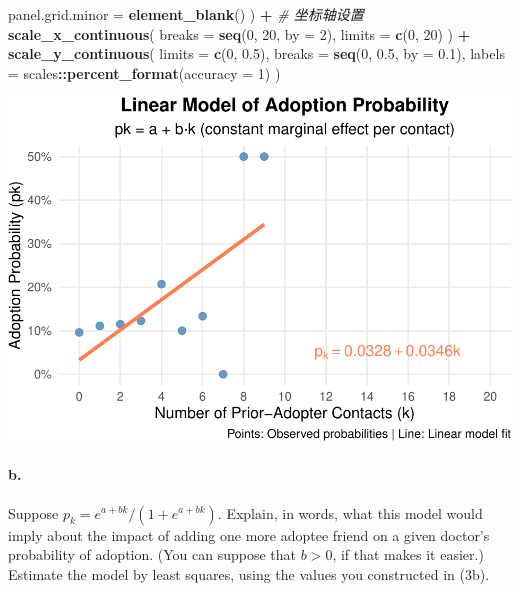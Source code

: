\documentclass[
]{article}
\newenvironment{Shaded}{\begin{snugshade}}{\end{snugshade}}
\newcommand{\AttributeTok}[1]{\textcolor[rgb]{0.13,0.29,0.53}{#1}}
\newcommand{\CommentTok}[1]{\textcolor[rgb]{0.56,0.35,0.01}{\textit{#1}}}
\newcommand{\DecValTok}[1]{\textcolor[rgb]{0.00,0.00,0.81}{#1}}
\newcommand{\FloatTok}[1]{\textcolor[rgb]{0.00,0.00,0.81}{#1}}
\newcommand{\FunctionTok}[1]{\textcolor[rgb]{0.13,0.29,0.53}{\textbf{#1}}}
\newcommand{\NormalTok}[1]{#1}
\newcommand{\SpecialCharTok}[1]{\textcolor[rgb]{0.81,0.36,0.00}{\textbf{#1}}}
\begin{document}
\begin{Shaded}
\begin{Highlighting}[]
    \AttributeTok{panel.grid.minor =} \FunctionTok{element\_blank}\NormalTok{()}
\NormalTok{  ) }\SpecialCharTok{+}
  \CommentTok{\# 坐标轴设置}
  \FunctionTok{scale\_x\_continuous}\NormalTok{(}
    \AttributeTok{breaks =} \FunctionTok{seq}\NormalTok{(}\DecValTok{0}\NormalTok{, }\DecValTok{20}\NormalTok{, }\AttributeTok{by =} \DecValTok{2}\NormalTok{),}
    \AttributeTok{limits =} \FunctionTok{c}\NormalTok{(}\DecValTok{0}\NormalTok{, }\DecValTok{20}\NormalTok{)}
\NormalTok{  ) }\SpecialCharTok{+}
  \FunctionTok{scale\_y\_continuous}\NormalTok{(}
    \AttributeTok{limits =} \FunctionTok{c}\NormalTok{(}\DecValTok{0}\NormalTok{, }\FloatTok{0.5}\NormalTok{),}
    \AttributeTok{breaks =} \FunctionTok{seq}\NormalTok{(}\DecValTok{0}\NormalTok{, }\FloatTok{0.5}\NormalTok{, }\AttributeTok{by =} \FloatTok{0.1}\NormalTok{),}
    \AttributeTok{labels =}\NormalTok{ scales}\SpecialCharTok{::}\FunctionTok{percent\_format}\NormalTok{(}\AttributeTok{accuracy =} \DecValTok{1}\NormalTok{)}
\NormalTok{  )}
\end{Highlighting}
\end{Shaded}

\includegraphics{Homework-04_files/figure-latex/unnamed-chunk-5-1.pdf}

\paragraph{b.}\label{b.-1}

Suppose \(p_k = e^{a+bk}/(1+e^{a+bk})\). Explain, in words, what this
model would imply about the impact of adding one more adoptee friend on
a given doctor's probability of adoption. (You can suppose that
\(b > 0\), if that makes it easier.) Estimate the model by least
squares, using the values you constructed in (3b).
\end{document}
